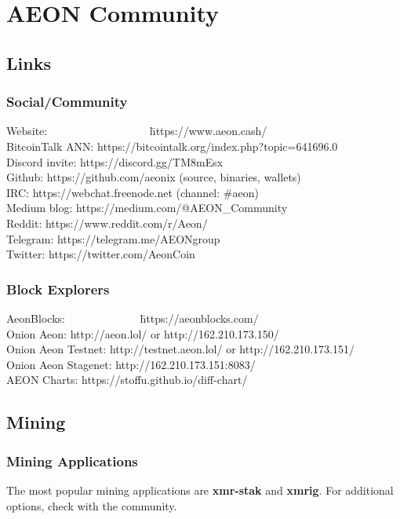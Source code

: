 \section{AEON Community}

\subsection{Links}
\subsubsection{Social/Community}
\begin{tabbing}
Website:~~~~~~~~~~~~~~~~~~ \= https://www.aeon.cash/ \\
BitcoinTalk ANN: \> https://bitcointalk.org/index.php?topic=641696.0\\
Discord invite:	\> https://discord.gg/TM8mEsx \\
Github: \> https://github.com/aeonix		(source, binaries, wallets)\\
IRC: \> https://webchat.freenode.net 		(channel:  \#aeon)\\
Medium blog: \> https://medium.com/@AEON\_Community \\
Reddit: \> https://www.reddit.com/r/Aeon/\\
Telegram: \> https://telegram.me/AEONgroup\\
Twitter: \> https://twitter.com/AeonCoin
\end{tabbing}

\subsubsection{Block Explorers}
\begin{tabbing}
AeonBlocks:~~~~~~~~~~~~~ \= https://aeonblocks.com/ \\
Onion Aeon: \> http://aeon.lol/ or http://162.210.173.150/ \\
Onion Aeon Testnet: \> http://testnet.aeon.lol/ or http://162.210.173.151/ \\
Onion Aeon Stagenet: \> http://162.210.173.151:8083/ \\
AEON Charts: \> https://stoffu.github.io/diff-chart/
\end{tabbing}

\subsection{Mining}
\subsubsection{Mining Applications}
The most popular mining applications are \textbf{xmr-stak} and \textbf{xmrig}.  For additional options, check with the community.

